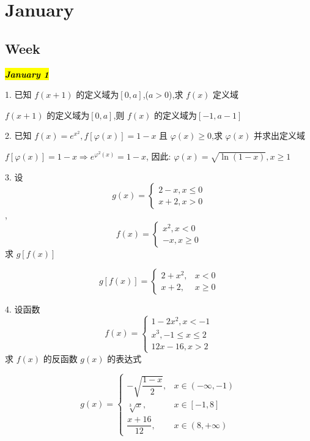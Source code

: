 \chapter{January}
\section{Week }

\hl{\textbf{\textit{January 1}}}

1. 已知 $f(x+1)$ 的定义域为$[0,a]$,($a>0$),求 $f(x)$ 定义域
\begin{solution}
	
	$f(x+1)$ 的定义域为$[0,a]$,则 $f(x)$ 的定义域为$[-1,a-1]$
\end{solution}

2. 已知 $f(x)=e^{x^{2}},f[\varphi(x)]=1-x$ 且 $\varphi(x)\geq 0$,求 $\varphi(x)$ 并求出定义域
\begin{solution}
	
	$f[\varphi(x)]=1-x\Rightarrow e^{\varphi^{2}(x)}=1-x$, 因此: $\varphi(x)=\sqrt{\ln (1-x)}, x\ge 1$
\end{solution}

3. 设 
	$$g(x)=
	\begin{cases}
		2-x,x\leq 0\\ x+2,x>0
	\end{cases}$$,$$f(x)=
	\begin{cases}
		x^{2},x< 0\\ -x,x\geq 0
	\end{cases}
	$$
求 $g[f(x)]$
\begin{solution}

	$$
	g[f(x)] = 
	\begin{cases}
		2+x^{2}, & x<0\\
		x+2, & x\geq 0
	\end{cases}
	$$
\end{solution}

4. 设函数 $$f(x)=
\begin{cases}
	1-2x^{2},x<-1\\
	x^{3},-1\leq x\leq 2\\
	12x-16,x>2
\end{cases}
$$
求 $f(x)$ 的反函数 $g(x)$ 的表达式
\begin{solution}
	$$
	g(x) = 
	\begin{cases}
		-\sqrt{\dfrac{1-x}{2}}, & x\in(-\infty,-1)\\
		\displaystyle{\sqrt[3]{x}}, & x\in[-1,8]\\
		\dfrac{x+16}{12}, & x\in(8,+\infty)
	\end{cases}
	$$
\end{solution}

